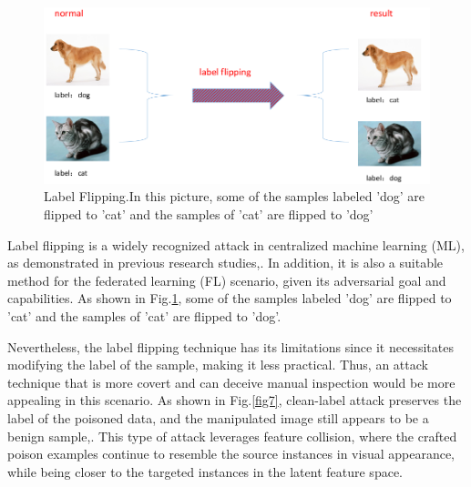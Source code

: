 \documentclass[conference]{IEEEtran}
\begin{document}
\begin{figure}[htbp]
    \centerline{\includegraphics[width=0.8\linewidth,height=0.5\linewidth]{picture/f6.png}}
    \caption{Label Flipping.In this picture, some of the samples labeled 'dog' are flipped to 'cat' and the samples of 'cat'
    are flipped to 'dog'}
    \label{fig6}
\end{figure}

Label flipping is a widely recognized attack in centralized machine learning (ML),
as demonstrated in previous research studies\cite{b54},\cite{b55}. In addition,
it is also a suitable method for the federated learning (FL) scenario,
given its adversarial goal and capabilities\cite{b56}.
As shown in Fig.\ref{fig6}, some of the samples labeled 'dog' are flipped to 'cat' and the samples of 'cat'
are flipped to 'dog'.


Nevertheless, the label flipping technique has its limitations since it necessitates
modifying the label of the sample, making it less practical. 
Thus, an attack technique that is more covert and can deceive manual inspection would be more
appealing in this scenario.
As shown in Fig.\ref{fig7}, clean-label attack preserves the label of the poisoned data,
and the manipulated image still appears to be a benign sample\cite{b57},\cite{b58}. This type of attack
leverages feature collision, where the crafted poison examples continue to
resemble the source instances in visual appearance, while being closer to the
targeted instances in the latent feature space.
\end{document}
